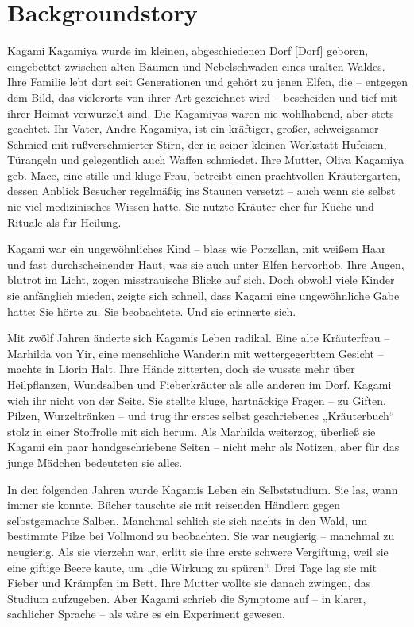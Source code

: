 \documentclass[12pt,a4paper]{article}
\begin{document}
\newpage

\section{Backgroundstory}

Kagami Kagamiya wurde im kleinen, abgeschiedenen Dorf [Dorf] geboren, eingebettet zwischen alten Bäumen und Nebelschwaden eines uralten Waldes. Ihre Familie lebt dort seit Generationen und gehört zu jenen Elfen, die – entgegen dem Bild, das vielerorts von ihrer Art gezeichnet wird – bescheiden und tief mit ihrer Heimat verwurzelt sind. Die Kagamiyas waren nie wohlhabend, aber stets geachtet. Ihr Vater, Andre Kagamiya, ist ein kräftiger, großer, schweigsamer Schmied mit rußverschmierter Stirn, der in seiner kleinen Werkstatt Hufeisen, Türangeln und gelegentlich auch Waffen schmiedet. Ihre Mutter, Oliva Kagamiya geb. Mace, eine stille und kluge Frau, betreibt einen prachtvollen Kräutergarten, dessen Anblick Besucher regelmäßig ins Staunen versetzt – auch wenn sie selbst nie viel medizinisches Wissen hatte. Sie nutzte Kräuter eher für Küche und Rituale als für Heilung.

Kagami war ein ungewöhnliches Kind – blass wie Porzellan, mit weißem Haar und fast durchscheinender Haut, was sie auch unter Elfen hervorhob. Ihre Augen, blutrot im Licht, zogen misstrauische Blicke auf sich. Doch obwohl viele Kinder sie anfänglich mieden, zeigte sich schnell, dass Kagami eine ungewöhnliche Gabe hatte: Sie hörte zu. Sie beobachtete. Und sie erinnerte sich.

Mit zwölf Jahren änderte sich Kagamis Leben radikal. Eine alte Kräuterfrau – Marhilda von Yir, eine menschliche Wanderin mit wettergegerbtem Gesicht – machte in Liorin Halt. Ihre Hände zitterten, doch sie wusste mehr über Heilpflanzen, Wundsalben und Fieberkräuter als alle anderen im Dorf. Kagami wich ihr nicht von der Seite. Sie stellte kluge, hartnäckige Fragen – zu Giften, Pilzen, Wurzeltränken – und trug ihr erstes selbst geschriebenes „Kräuterbuch“ stolz in einer Stoffrolle mit sich herum. Als Marhilda weiterzog, überließ sie Kagami ein paar handgeschriebene Seiten – nicht mehr als Notizen, aber für das junge Mädchen bedeuteten sie alles.

In den folgenden Jahren wurde Kagamis Leben ein Selbststudium. Sie las, wann immer sie konnte. Bücher tauschte sie mit reisenden Händlern gegen selbstgemachte Salben. Manchmal schlich sie sich nachts in den Wald, um bestimmte Pilze bei Vollmond zu beobachten. Sie war neugierig – manchmal zu neugierig. Als sie vierzehn war, erlitt sie ihre erste schwere Vergiftung, weil sie eine giftige Beere kaute, um „die Wirkung zu spüren“. Drei Tage lag sie mit Fieber und Krämpfen im Bett. Ihre Mutter wollte sie danach zwingen, das Studium aufzugeben. Aber Kagami schrieb die Symptome auf – in klarer, sachlicher Sprache – als wäre es ein Experiment gewesen.
\end{document}

